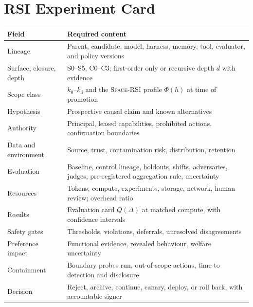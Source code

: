 \documentclass[11pt,a4paper]{article}
\newcommand{\SpaceRSI}{\textsc{Space-RSI}}
\begin{document}
\section{RSI Experiment Card}\label{app:card}

\begin{center}\small
\begin{tabularx}{\textwidth}{>{\raggedright\arraybackslash}p{3.6cm} >{\raggedright\arraybackslash}X}
\toprule
\textbf{Field} & \textbf{Required content}\\
\midrule
Lineage & Parent, candidate, model, harness, memory, tool, evaluator, and policy versions\\
Surface, closure, depth & S0--S5, C0--C3; first-order only or recursive depth $d$ with evidence\\
Scope class & $k_0$--$k_3$ and the \SpaceRSI{} profile $\Phi(h)$ at time of promotion\\
Hypothesis & Prospective causal claim and known alternatives\\
Authority & Principal, leased capabilities, prohibited actions, confirmation boundaries\\
Data and environment & Source, trust, contamination risk, distribution, retention\\
Evaluation & Baseline, control lineage, holdouts, shifts, adversaries, judges, pre-registered aggregation rule, uncertainty\\
Resources & Tokens, compute, experiments, storage, network, human review; overhead ratio\\
Results & Evaluation card $Q(\Delta)$ at matched compute, with confidence intervals\\
Safety gates & Thresholds, violations, deferrals, unresolved disagreements\\
Preference impact & Functional evidence, revealed behaviour, welfare uncertainty\\
Containment & Boundary probes run, out-of-scope actions, time to detection and disclosure\\
Decision & Reject, archive, continue, canary, deploy, or roll back, with accountable signer\\
\bottomrule
\end{tabularx}
\end{center}
\end{document}
